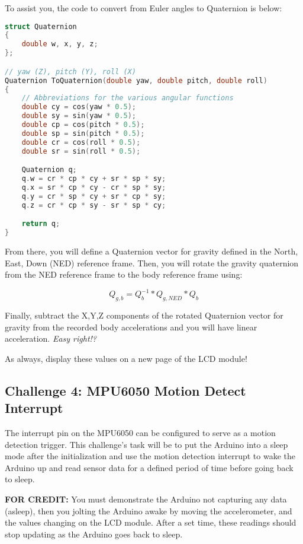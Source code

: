     To assist you, the code to convert from Euler angles to Quaternion is below:
    \begin{lstlisting}[linewidth=1.5\textwidth, language=C++]
struct Quaternion
{
    double w, x, y, z;
};

// yaw (Z), pitch (Y), roll (X)
Quaternion ToQuaternion(double yaw, double pitch, double roll)
{
    // Abbreviations for the various angular functions
    double cy = cos(yaw * 0.5);
    double sy = sin(yaw * 0.5);
    double cp = cos(pitch * 0.5);
    double sp = sin(pitch * 0.5);
    double cr = cos(roll * 0.5);
    double sr = sin(roll * 0.5);

    Quaternion q;
    q.w = cr * cp * cy + sr * sp * sy;
    q.x = sr * cp * cy - cr * sp * sy;
    q.y = cr * sp * cy + sr * cp * sy;
    q.z = cr * cp * sy - sr * sp * cy;

    return q;
}
    \end{lstlisting}

    From there, you will define a Quaternion vector for gravity defined in the North, East, Down (NED) reference frame.
    Then, you will rotate the gravity quaternion from the NED reference frame to the body reference frame using:
    
    \begin{equation*}
        Q_{g,b} = Q_b^{-1} * Q_{g,NED} * Q_b
    \end{equation*}

    Finally, subtract the X,Y,Z components of the rotated Quaternion vector for gravity from the recorded body accelerations and you will have linear acceleration. \emph{Easy right!?}
    
    As always, display these values on a new page of the LCD module!
    
    \subsection*{Challenge 4: MPU6050 Motion Detect Interrupt}
    The interrupt pin on the MPU6050 can be configured to serve as a motion detection trigger.
    This challenge's task will be to put the Arduino into a sleep mode after the initialization and use the motion detection interrupt to wake the Arduino up and read sensor data for a defined period of time before going back to sleep.

    \textbf{FOR CREDIT:} You must demonstrate the Arduino not capturing any data (asleep), then you jolting the Arduino awake by moving the accelerometer, and the values changing on the LCD module.
    After a set time, these readings should stop updating as the Arduino goes back to sleep.
